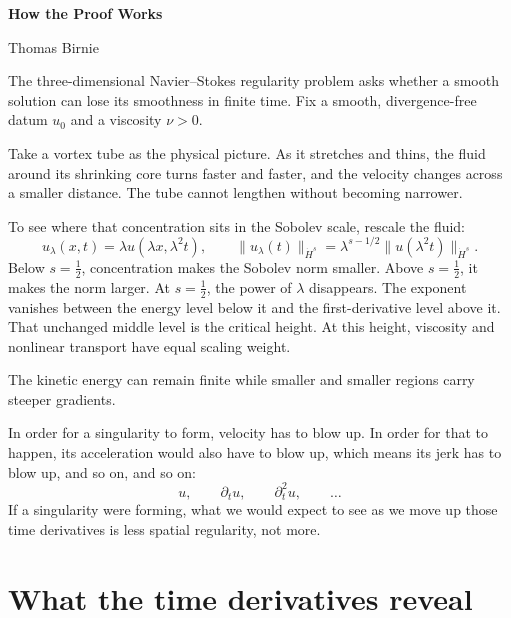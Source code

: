 \documentclass[12pt]{article}
\begin{document}
\begin{center}
  {\LARGE\bfseries How the Proof Works}\par
  \vspace{0.4\baselineskip}
  {\normalsize Thomas Birnie}\par
\end{center}

\vspace{0.65\baselineskip}

The three-dimensional Navier--Stokes regularity problem asks whether a smooth
solution can lose its smoothness in finite time. Fix a smooth, divergence-free
datum \(u_0\) and a viscosity \(\nu>0\).

Take a vortex tube as the physical picture. As it stretches and thins, the
fluid around its shrinking core turns faster and faster, and the velocity
changes across a smaller distance. The tube cannot lengthen without becoming
narrower.

To see where that concentration sits in the Sobolev scale, rescale the fluid:
\[
  u_\lambda(x,t)=\lambda u(\lambda x,\lambda^2t),
  \qquad
  \|u_\lambda(t)\|_{\dot H^s}
  =
  \lambda^{s-1/2}\|u(\lambda^2t)\|_{\dot H^s}.
\]
Below \(s=\tfrac12\), concentration makes the Sobolev norm smaller. Above
\(s=\tfrac12\), it makes the norm larger. At \(s=\tfrac12\), the power of
\(\lambda\) disappears. The exponent vanishes between the energy level below it
and the first-derivative level above it. That unchanged middle level is the
critical height. At this height, viscosity and nonlinear transport have equal
scaling weight.

The kinetic energy can remain finite while smaller and smaller regions carry
steeper gradients.

In order for a singularity to form, velocity has to blow up. In order for that
to happen, its acceleration would also have to blow up, which means its jerk
has to blow up, and so on, and so on:
\[
  u,
  \qquad
  \partial_tu,
  \qquad
  \partial_t^2u,
  \qquad
  \ldots
\]
If a singularity were forming, what we would expect to see as we move up those
time derivatives is less spatial regularity, not more.

\clearpage
\section*{What the time derivatives reveal}
\end{document}
